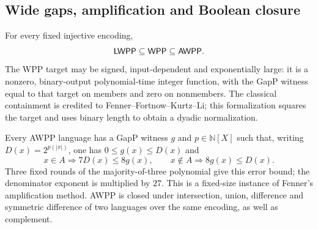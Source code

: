 \begin{result}
\end{result}


\begin{result}
\subsection{Wide gaps, amplification and Boolean closure}
For every fixed injective encoding,
\[
\mathsf{LWPP}\subseteq\mathsf{WPP}\subseteq\mathsf{AWPP}.
\]
The WPP target may be signed, input-dependent and exponentially large: it is a
nonzero, binary-output polynomial-time integer function, with the GapP witness
equal to that target on members and zero on nonmembers.
The classical containment is credited to Fenner--Fortnow--Kurtz--Li;
this formalization squares the target and uses binary length to obtain a dyadic
normalization.\citep[Section 6.1]{FennerEtAl2003}

Every AWPP language has a GapP witness $g$ and $p\in\mathbb{N}[X]$ such that,
writing $D(x)=2^{p(|x|)}$, one has $0\leq g(x)\leq D(x)$ and
\[
x\in A\Rightarrow 7D(x)\leq8g(x),\qquad
x\notin A\Rightarrow 8g(x)\leq D(x).
\]
Three fixed rounds of the majority-of-three polynomial give this error bound;
the denominator exponent is multiplied by $27$. This is a fixed-size instance
of Fenner's amplification method.\citep{Fenner2003}
AWPP is closed under intersection, union, difference and symmetric difference
of two languages over the same encoding, as well as complement.


\end{result}

